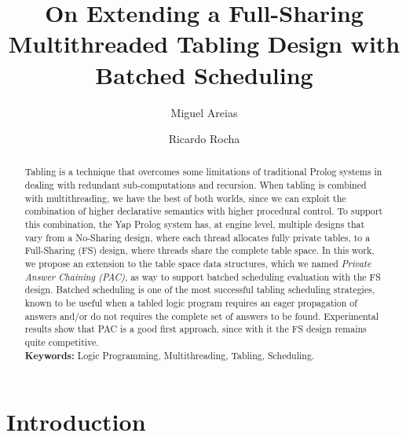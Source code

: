 \documentclass{llncs}
\begin{document}
\title{On Extending a Full-Sharing Multithreaded Tabling Design with Batched Scheduling}

\author{Miguel Areias \and Ricardo Rocha}


\maketitle


\begin{abstract}
  Tabling is a technique that overcomes some limitations of
  traditional Prolog systems in dealing with redundant
  sub-computations and recursion. When tabling is combined with
  multithreading, we have the best of both worlds, since we can
  exploit the combination of higher declarative semantics with higher
  procedural control. To support this combination, the Yap Prolog
  system has, at engine level, multiple designs that vary from a
  No-Sharing design, where each thread allocates fully private tables,
  to a Full-Sharing (FS) design, where threads share the complete
  table space. In this work, we propose an extension to the table
  space data structures, which we named \emph{Private Answer Chaining
    (PAC)}, as way to support batched scheduling evaluation with the
  FS design. Batched scheduling is one of the most successful tabling
  scheduling strategies, known to be useful when a tabled logic
  program requires an eager propagation of answers and/or do not
  requires the complete set of answers to be found. Experimental
  results show that PAC is a good first approach, since with it the FS
  design remains quite competitive.\\

\textbf{Keywords:} Logic Programming, Multithreading, Tabling, Scheduling.
\end{abstract}


\section{Introduction}
\end{document}
